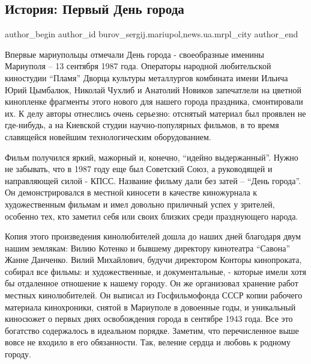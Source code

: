  
 
 
 
 
 
\subsection{История: Первый День города}
\label{sec:09_09_2017.stz.news.ua.mrpl_city.1.istoria_pervyj_den_goroda}
 
\ifcmt
 author_begin
   author_id burov_sergij.mariupol,news.ua.mrpl_city
 author_end
\fi


Впервые мариупольцы отмечали День города - своеобразные именины Мариуполя  – 13
сентября 1987 года. Операторы народной любительской киностудии \enquote{Пламя} Дворца
культуры металлургов комбината имени Ильича Юрий Цымбалюк, Николай Чухлиб и
Анатолий Новиков  запечатлели на цветной кинопленке фрагменты этого нового для
нашего города праздника, смонтировали их. К делу авторы отнеслись очень
серьезно: отснятый материал был проявлен не где-нибудь, а на Киевской студии
научно-популярных фильмов, в то время славящейся новейшим технологическим
оборудованием.


Фильм получился яркий, мажорный и, конечно, \enquote{идейно выдержанный}. Нужно не
забывать, что в 1987 году еще был Советский Союз, а руководящей и направляющей
силой -  КПСС. Название фильму дали без затей – \enquote{День города}. Он
демонстрировался в местной киносети в качестве киножурнала к художественным
фильмам и имел довольно приличный успех у зрителей, особенно тех, кто заметил
себя или своих близких среди празднующего народа.


Копия этого произведения кинолюбителей дошла до наших дней благодаря двум нашим
землякам: Вилию Котенко и бывшему директору кинотеатра \enquote{Савона} Жанне Данченко.
Вилий Михайлович, будучи директором Конторы кинопроката, собирал все фильмы: и
художественные, и документальные, - которые имели хотя бы отдаленное отношение
к нашему городу. Он же  организовал хранение работ местных кинолюбителей. Он
выписал из Госфильмофонда СССР копии рабочего материала кинохроники, снятой в
Мариуполе в довоенные годы, и уникальный киносюжет о первых днях освобождения
города в сентябре 1943 года. Все это богатство содержалось в идеальном порядке.
Заметим, что перечисленное выше вовсе не входило в его обязанности. Так,
веление сердца и любовь к родному городу.

